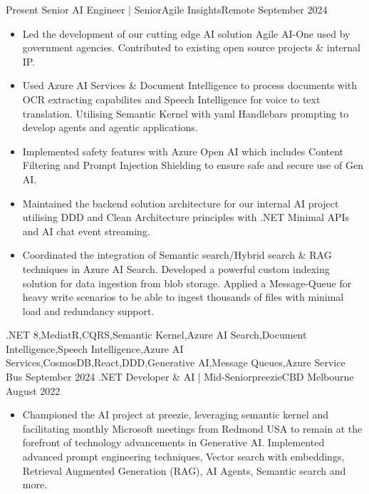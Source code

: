 
\begin{experiences}
  \experience
    {Present}   {Senior AI Engineer | Senior}{Agile Insights}{Remote}
    {September 2024} {
                      \begin{itemize}
					    \item Led the development of our cutting edge AI solution Agile AI-One used by government agencies. Contributed to existing open source projects \& internal IP.
						\item Used Azure AI Services \& Document Intelligence to process documents with OCR extracting capabilites and Speech Intelligence for voice to text translation. Utilising Semantic Kernel with yaml Handlebars prompting to develop agents and agentic applications.
						\item Implemented safety features with Azure Open AI which includes Content Filtering and Prompt Injection Shielding to ensure safe and secure use of Gen AI.
						\item Maintained the backend solution architecture for our internal AI project utilising DDD and Clean Architecture principles with .NET Minimal APIs and AI chat event streaming.
                        \item Coordinated the integration of Semantic search/Hybrid search \& RAG techniques in Azure AI Search. Developed a powerful custom indexing solution for data ingestion from blob storage. Applied a Message-Queue for heavy write scenarios to be able to ingest thousands of files with minimal load and redundancy support.
                      \end{itemize}
                    }
                    {.NET 8,MediatR,CQRS,Semantic Kernel,Azure AI Search,Document Intelligence,Speech Intelligence,Azure AI Services,CosmosDB,React,DDD,Generative AI,Message Queues,Azure Service Bus}
  \emptySeparator
  \experience
    {September 2024}   {.NET Developer \& AI | Mid-Senior}{preezie}{CBD Melbourne}
    {August 2022} {
                      \begin{itemize}
					    \item Championed the AI project at preezie, leveraging semantic kernel and facilitating monthly Microsoft meetings from Redmond USA to remain at the forefront of technology advancements in Generative AI. Implemented advanced prompt engineering techniques, Vector search with embeddings, Retrieval Augmented Generation (RAG), AI Agents, Semantic search and more.

\end{itemize}}
\end{experiences}
